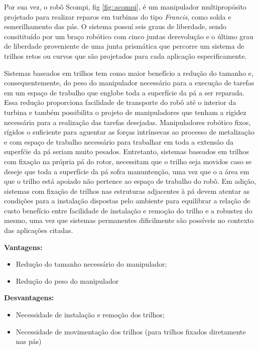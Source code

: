 Por sua vez, o robô Scompi, fig \ref{fig::scompi}, é um manipulador
multipropósito projetado para realizar reparos em turbinas do tipo \textit{Francis},
 como solda e esmerilhamento das pás. O sistema possuí seis graus de liberdade, sendo 
consitituído por um braço robótico com cinco juntas derevolução e o último grau
 de liberdade proveniente de uma junta prismática que percorre um sistema de 
 trilhos retos ou curvos que são projetados para cada aplicação especificamente. 


Sistemas baseados em trilhos tem como maior benefício a redução do tamanho e,
consequentemente, do peso do manipulador necessário para a execução de tarefas
em um espaço de trabalho que englobe toda a superfície da pá a ser reparada.
Essa redução proporciona facilidade de transporte do robô até o interior da
turbina e também possibilita o projeto de manipuladores que tenham a rigidez
necessária para a realização das tarefas desejadas. Manipuladores
robótico fixos, rígidos o suficiente para aguentar as forças intrínsecas ao
processo de metalização e com espaço de trabalho necessário para trabalhar em
toda a extensão da superfćie da pá seriam muito pesados.
Entretanto, sistemas baseados em trilhos com fixação na própria pá do rotor, necessitam que
o trilho seja movidos caso se deseje que toda a superfície da pá sofra
manuntenção, uma vez que o a área em que o trilho está apoiado não pertence ao espaço de
trabalho do robô. Em adição, sistemas com fixação de trilhos nas estruturas
adjacentes à pá devem atentar as condições para a instalação dispostas pelo
ambiente para equilibrar a relação de custo benefício entre facilidade de
instalação e remoção do trilho e a robustez do mesmo, uma vez que sistemas
permanentes dificilmente são possíveis no contexto das aplicações citadas.

\textbf{Vantagens:}
\begin{itemize}
  \item Redução do tamanho necessário do manipulador;
  \item Redução do peso do manipulador
\end{itemize}

\textbf{Desvantagens:}
\begin{itemize}
  \item Necessidade de instalação e remoção dos trilhos;
  \item Necessidade de movimentação dos trilhos (para trilhos fixados
  diretamente nas pás)
\end{itemize}



